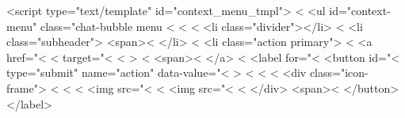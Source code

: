 {<script type="text/template" id="context_menu_tmpl">
  <%
    <ul id="context-menu" class="chat-bubble menu <%
  <%
      <%
        <li class="divider"></li>
      <%
        <li class="subheader">
            <span><%
        </li>
      <%
        <li class="action primary">
          <%
            <a href="<%
              <%
                target="<%
              <%
            >
                <%
                <span><%
            </a>
          <%
            <label for="<%
                <button id="<%
                     type="submit"
                     name="action"
                     data-value="<%
                     >
                    <%
                      <%
                    <%
                    <div class="icon-frame">
                      <%
                        <%
                      <%
                        <img src="<%
                      <%
                        <img src="<%
                      <%
                    </div>
                    <span><%
                </button>
            </label>

}
